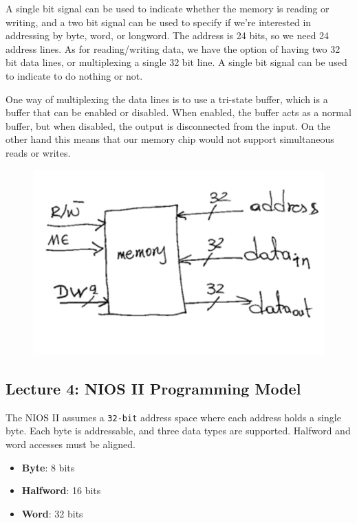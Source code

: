 \documentclass[10pt]{article}
\begin{document}
A single bit signal can be used to indicate whether the memory is reading or writing, and a two bit signal can be used to specify if we're interested in addressing by byte, word, or longword.
The address is 24 bits, so we need 24 address lines.
As for reading/writing data, we have the option of having two 32 bit data lines, or multiplexing a single 32 bit line.
A single bit signal can be used to indicate to do nothing or not. 

One way of multiplexing the data lines is to use a tri-state buffer, which is a buffer that can be enabled or disabled.
When enabled, the buffer acts as a normal buffer, but when disabled, the output is disconnected from the input.
On the other hand this means that our memory chip would not support simultaneous reads or writes.




\begin{figure}[H]
	\centering
	\includegraphics[width=0.8\linewidth]{img/image_2022-09-16-02-18-16.png}
\end{figure}

\subsection{Lecture 4: NIOS II Programming Model}

The NIOS II assumes a \texttt{32-bit} address space where each address holds a single byte.
Each byte is addressable, and three data types are supported. Halfword and word accesses must be aligned.

\begin{itemize}
	\item \textbf{Byte}: 8 bits
	\item \textbf{Halfword}: 16 bits
	\item \textbf{Word}: 32 bits
\end{itemize}
\end{document}
